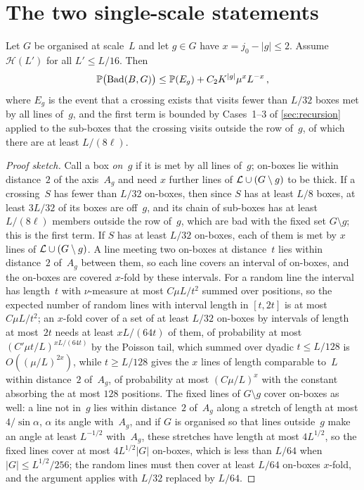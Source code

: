 \documentclass[11pt,letterpaper]{article}
\newcommand{\Bad}{\mathrm{Bad}}
\begin{document}
\section{The two single-scale statements}
\label{sec:single}

\begin{lemma}
\label{lem:NC}
Let $G$ be organised at scale~$L$ and let $g\in G$ have $x=j_0-\lvert g\rvert\le2$. Assume $\mathcal H(L')$ for all $L'\le L/16$. Then
\begin{equation*}
  \P\bigl(\Bad(B,G)\bigr)\le\P(E_g)+C_2K^{\lvert g\rvert}\mu^xL^{-x}\,,
\end{equation*}
where $E_g$ is the event that a crossing exists that visits fewer than $L/32$ boxes met by all lines of~$g$,
and the first term is bounded by Cases~1--3 of \cref{sec:recursion} applied to the sub-boxes that the crossing visits outside the row of~$g$, of which there are at least $L/(8\ell)$.
\end{lemma}

\begin{proof}[Proof sketch]
Call a box \emph{on~$g$} if it is met by all lines of~$g$; on-boxes lie within distance~$2$ of the axis~$A_g$ and need $x$ further lines of $\mathcal L\cup(G\setminus g)$ to be thick. If a crossing~$S$ has fewer than $L/32$ on-boxes, then since $S$ has at least $L/8$ boxes, at least $3L/32$ of its boxes are off~$g$, and its chain of sub-boxes has at least $L/(8\ell)$ members outside the row of~$g$, which are bad with the fixed set $G\setminus g$; this is the first term. If $S$ has at least $L/32$ on-boxes, each of them is met by $x$ lines of $\mathcal L\cup(G\setminus g)$. A line meeting two on-boxes at distance~$t$ lies within distance~$2$ of~$A_g$ between them, so each line covers an interval of on-boxes, and the on-boxes are covered $x$-fold by these intervals. For a random line the interval has length~$t$ with $\nu$-measure at most $C\mu L/t^2$ summed over positions, so the expected number of random lines with interval length in $[t,2t]$ is at most $C\mu L/t^2$; an $x$-fold cover of a set of at least $L/32$ on-boxes by intervals of length at most~$2t$ needs at least $xL/(64t)$ of them, of probability at most $(C'\mu t/L)^{xL/(64t)}$ by the Poisson tail, which summed over dyadic $t\le L/128$ is $O((\mu/L)^{2x})$, while $t\ge L/128$ gives the $x$ lines of length comparable to~$L$ within distance~$2$ of~$A_g$, of probability at most $(C\mu/L)^x$ with the constant absorbing the at most $128$ positions. The fixed lines of $G\setminus g$ cover on-boxes as well: a line not in~$g$ lies within distance~$2$ of~$A_g$ along a stretch of length at most $4/\sin\alpha$, $\alpha$ its angle with~$A_g$, and if $G$ is organised so that lines outside~$g$ make an angle at least $L^{-1/2}$ with~$A_g$, these stretches have length at most $4L^{1/2}$, so the fixed lines cover at most $4L^{1/2}\lvert G\rvert$ on-boxes, which is less than $L/64$ when $\lvert G\rvert\le L^{1/2}/256$; the random lines must then cover at least $L/64$ on-boxes $x$-fold, and the argument applies with $L/32$ replaced by $L/64$.
\end{proof}
\end{document}
